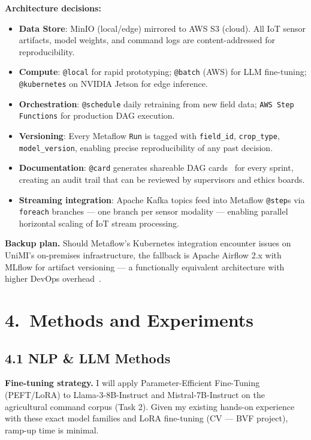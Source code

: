 \documentclass[11pt,a4paper]{article}
\begin{document}
\vspace{4pt}
\textbf{Architecture decisions:}
\begin{itemize}[leftmargin=1.2em,itemsep=2pt]
  \item \textbf{Data Store}: MinIO (local/edge) mirrored to AWS S3 (cloud). All IoT sensor
  artifacts, model weights, and command logs are content-addressed for reproducibility.
  \item \textbf{Compute}: \texttt{@local} for rapid prototyping; \texttt{@batch} (AWS) for
  LLM fine-tuning; \texttt{@kubernetes} on NVIDIA Jetson for edge inference.
  \item \textbf{Orchestration}: \texttt{@schedule} daily retraining from new field data;
  \texttt{AWS Step Functions} for production DAG execution.
  \item \textbf{Versioning}: Every Metaflow \texttt{Run} is tagged with \texttt{field\_id},
  \texttt{crop\_type}, \texttt{model\_version}, enabling precise reproducibility of any past decision.
  \item \textbf{Documentation}: \texttt{@card} generates shareable DAG cards~\cite{tagliabue_dag_card_2021}
  for every sprint, creating an audit trail that can be reviewed by supervisors and ethics boards.
  \item \textbf{Streaming integration}: Apache Kafka topics feed into Metaflow \texttt{@step}s
  via \texttt{foreach} branches — one branch per sensor modality — enabling parallel
  horizontal scaling of IoT stream processing.
\end{itemize}

\textbf{Backup plan.} Should Metaflow's Kubernetes integration encounter issues on UniMI's
on-premises infrastructure, the fallback is Apache Airflow 2.x with MLflow for artifact
versioning — a functionally equivalent architecture with higher DevOps overhead~\cite{tagliabue_metaflow_2023}.

\section{4.\ Methods and Experiments}

\subsection{4.1 NLP \& LLM Methods}

\textbf{Fine-tuning strategy.} I will apply Parameter-Efficient Fine-Tuning (PEFT/LoRA) to
Llama-3-8B-Instruct and Mistral-7B-Instruct on the agricultural command corpus (Task 2).
Given my existing hands-on experience with these exact model families and LoRA fine-tuning
(CV — BVF project), ramp-up time is minimal.
\end{document}
